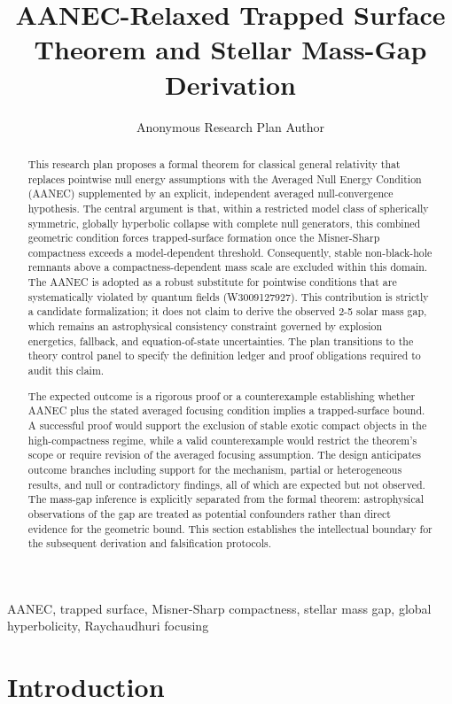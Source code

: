 \documentclass[conference]{IEEEtran}
\begin{document}
\title{AANEC-Relaxed Trapped Surface Theorem and Stellar Mass-Gap Derivation}\author{Anonymous Research Plan Author}\maketitle

\begin{abstract}
This research plan proposes a formal theorem for classical general relativity that replaces pointwise null energy assumptions with the Averaged Null Energy Condition (AANEC) supplemented by an explicit, independent averaged null-convergence hypothesis. The central argument is that, within a restricted model class of spherically symmetric, globally hyperbolic collapse with complete null generators, this combined geometric condition forces trapped-surface formation once the Misner-Sharp compactness exceeds a model-dependent threshold. Consequently, stable non-black-hole remnants above a compactness-dependent mass scale are excluded within this domain. The AANEC is adopted as a robust substitute for pointwise conditions that are systematically violated by quantum fields (W3009127927). This contribution is strictly a candidate formalization; it does not claim to derive the observed 2-5 solar mass gap, which remains an astrophysical consistency constraint governed by explosion energetics, fallback, and equation-of-state uncertainties. The plan transitions to the theory control panel to specify the definition ledger and proof obligations required to audit this claim.

The expected outcome is a rigorous proof or a counterexample establishing whether AANEC plus the stated averaged focusing condition implies a trapped-surface bound. A successful proof would support the exclusion of stable exotic compact objects in the high-compactness regime, while a valid counterexample would restrict the theorem's scope or require revision of the averaged focusing assumption. The design anticipates outcome branches including support for the mechanism, partial or heterogeneous results, and null or contradictory findings, all of which are expected but not observed. The mass-gap inference is explicitly separated from the formal theorem: astrophysical observations of the gap are treated as potential confounders rather than direct evidence for the geometric bound. This section establishes the intellectual boundary for the subsequent derivation and falsification protocols.
\end{abstract}
\begin{IEEEkeywords}
AANEC, trapped surface, Misner-Sharp compactness, stellar mass gap, global hyperbolicity, Raychaudhuri focusing
\end{IEEEkeywords}\section{Introduction}
\end{document}
